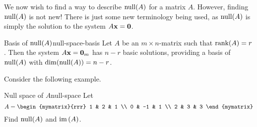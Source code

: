 We now wish to find a way to describe $\nullspace(A)$ for a matrix
$A$. However, finding $\nullspace(A)$ is not new! There is just
some new terminology being used, as $\nullspace(A) $ is simply
the solution to the system $A\mbox{\bf x}=\mbox{\bf 0}$.

\begin{theorem}{Basis of $\nullspace(A)$}{null-space-basis}
  Let $A$ be an $m \times n$-matrix such that $\mbox{\rm rank}(A) =
  r$. Then the system $A\mbox{\bf x}=\mbox{\bf 0}_m$ has $n-r$ basic
  solutions, providing a basis of $\nullspace(A)$ with
  $\dim(\nullspace(A))=n-r$.
\end{theorem}

Consider the following example.

\begin{example}{Null space of $A$}{null-space}
  Let
  \begin{equation*}
    A=\begin{mymatrix}{rrr}
      1 & 2 & 1 \\
      0 & -1 & 1 \\
      2 & 3 & 3
    \end{mymatrix}
  \end{equation*}
  Find $\nullspace(A) $ and $\mbox{\rm im}\left(A\right)$.
\end{example}

